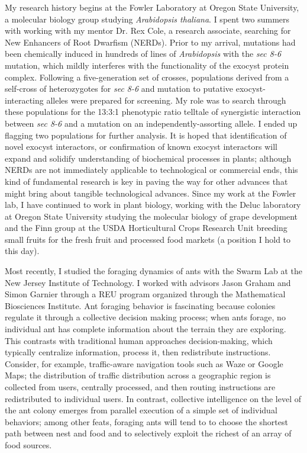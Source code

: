\documentclass[12pt]{book}
\begin{document}
My research history begins at the Fowler Laboratory at Oregon State University, a molecular biology group studying \textit{Arabidopsis thaliana}. I spent two summers with working with my mentor Dr. Rex Cole, a research associate, searching for New Enhancers of Root Dwarfism (NERDs). Prior to my arrival, mutations had been chemically induced in hundreds of lines of \textit{Arabidopsis} with the \textit{sec 8-6} mutation, which mildly interferes with the functionality of the exocyst protein complex. Following a five-generation set of crosses, populations derived from a self-cross of heterozygotes for \textit{sec 8-6} and mutation to putative exocyst-interacting alleles were prepared for screening. My role was to search through these populations for the 13:3:1 phenotypic ratio telltale of synergistic interaction between \textit{sec 8-6} and a mutation on an independently-assorting allele. I ended up flagging two populations for further analysis. It is hoped that identification of novel exocyst interactors, or confirmation of known exocyst interactors will expand and solidify understanding of biochemical processes in plants; although NERDs are not immediately applicable to technological or commercial ends, this kind of fundamental research is key in paving the way for other advances that might bring about tangible technological advances. Since my work at the Fowler lab, I have continued to work in plant biology, working with the Deluc laboratory at Oregon State University studying the molecular biology of grape development and the Finn group at the USDA Horticultural Crops Research Unit breeding small fruits for the fresh fruit and processed food markets (a position I hold to this day). 

Most recently, I studied the foraging dynamics of ants with the Swarm Lab at the New Jersey Institute of Technology. I worked with advisors Jason Graham and Simon Garnier through a REU program organized through the Mathematical Biosciences Institute. Ant foraging behavior is fascinating because colonies regulate it through a collective decision making process; when ants forage, no individual ant has complete information about the terrain they are exploring. This contrasts with traditional human approaches decision-making, which typically centralize information, process it, then redistribute instructions. Consider, for example, traffic-aware navigation tools such as Waze or Google Maps; the distribution of traffic distribution across a geographic region is collected from users, centrally processed, and then routing instructions are redistributed to individual users. In contrast, collective intelligence on the level of the ant colony emerges from parallel execution of a simple set of individual behaviors; among other feats, foraging ants will tend to to choose the shortest path between nest and food and to selectively exploit the richest of an array of food sources.
\end{document}
